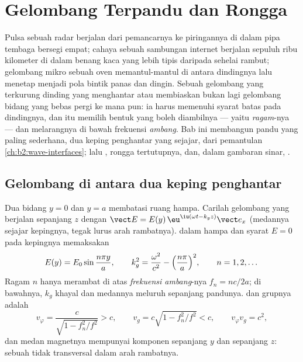 \chapter{Gelombang Terpandu dan Rongga}\label{ch:b2:guided-waves}

Pulsa sebuah radar berjalan dari pemancarnya ke piringannya di dalam
pipa tembaga bersegi empat; cahaya sebuah sambungan internet berjalan sepuluh
ribu kilometer di dalam benang kaca yang lebih tipis daripada sehelai rambut;
gelombang mikro sebuah oven memantul-mantul di antara dindingnya lalu menetap menjadi
pola bintik panas dan dingin. Sebuah gelombang yang terkurung dinding yang menghantar atau
membiaskan bukan lagi gelombang bidang yang bebas pergi ke mana pun: ia
harus memenuhi syarat batas pada dindingnya, dan itu memilih
bentuk yang boleh diambilnya --- yaitu \emph{ragam}-nya --- dan melarangnya di bawah
frekuensi \emph{ambang}. Bab ini membangun pandu yang paling sederhana, dua
keping penghantar yang sejajar, dari pemantulan
\cref{ch:b2:wave-interfaces}; lalu ,
rongga tertutupnya, dan, dalam gambaran sinar, .

\section{Gelombang di antara dua keping penghantar}

\begin{proposition}\label{prop:b2:guided-waves:plates}
Dua bidang  $y = 0$ dan $y = a$ membatasi ruang hampa.
Carilah gelombang yang berjalan sepanjang $z$ dengan $\vect E = E(y)\,\eu^{\iu(\omega t - k_gz)}
\vect e_x$ (medannya sejajar kepingnya, tegak lurus arah
rambatnya).  dalam hampa dan syarat $E = 0$
pada kepingnya memaksakan
\[
E(y) = E_0\sin\frac{n\pi y}a , \qquad
k_g^2 = \frac{\omega^2}{c^2} - \Bigl(\frac{n\pi}a\Bigr)^2 , \qquad n = 1, 2, \dots
\]
Ragam $n$ hanya merambat di atas \emph{frekuensi ambang}-nya $f_n = nc/2a$;
di bawahnya, $k_g$ khayal dan medannya meluruh sepanjang pandunya.  dan grupnya adalah
\[
v_\varphi = \frac c{\sqrt{1 - f_n^2/f^2}} > c , \qquad
v_g = c\sqrt{1 - f_n^2/f^2} < c , \qquad v_\varphi v_g = c^2 ,
\]
dan medan magnetnya mempunyai komponen sepanjang $y$ dan sepanjang $z$: sebuah
 tidak transversal dalam arah rambatnya.
\end{proposition}

